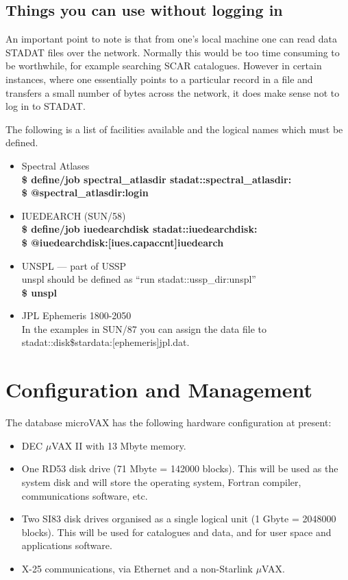 \subsection{Things you can use without logging in}

An important point to note is that from one's local machine one can 
read data STADAT files over the network. Normally this would be
too time consuming to be worthwhile, for example searching SCAR catalogues.
However in certain instances, where one essentially points to a particular
record in a file and transfers a small number of bytes across the network,
it does make sense not to log in to STADAT.

The following is a list of facilities available and the logical names
which must be defined.

\begin{itemize}
\item Spectral Atlases\\
{\bf \$ define/job spectral\_atlasdir stadat::spectral\_atlasdir:\\
\$ @spectral\_atlasdir:login\\ }
\item IUEDEARCH (SUN/58)\\
{\bf \$ define/job iuedearchdisk stadat::iuedearchdisk:\\
\$ @iuedearchdisk:[iues.capaccnt]iuedearch }

\item UNSPL --- part of USSP\\
 unspl should be defined as ``run stadat::ussp\_dir:unspl''\\
{\bf \$ unspl}

\item    JPL Ephemeris 1800-2050  \\
         In the examples in SUN/87 you can assign the data file to
         stadat::disk\$stardata:[ephemeris]jpl.dat.

\end{itemize}



\section{Configuration and Management}

The database microVAX has the following hardware configuration at present:
\begin{itemize}
\item DEC $\mu$VAX II with 13 Mbyte memory.
\item One RD53 disk drive (71 Mbyte = 142000 blocks).
This will be used as the system disk and will store the operating system,
Fortran compiler, communications software, etc.
\item Two SI83 disk drives organised as a single logical unit
(1 Gbyte = 2048000 blocks).
This will be used for catalogues and data, and for user space and
applications software.
\item X-25 communications, via Ethernet and a non-Starlink $\mu$VAX.
\end{itemize}


